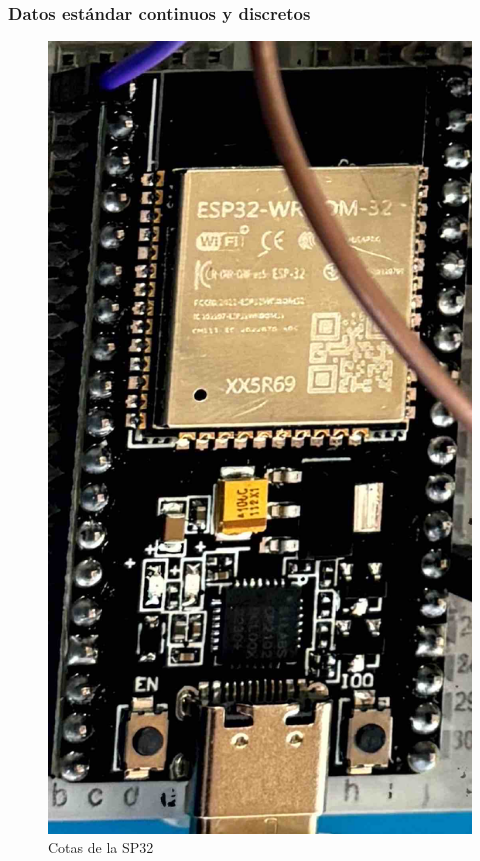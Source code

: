     \subsubsection{Datos estándar continuos y discretos}
    \begin{figure}[H]
        \centering
        \includegraphics[trim = {1mm 1mm 1mm 1mm},clip,scale=0.3]{8/Img/SP32.pdf}
        \caption{Cotas de la SP32}
        \label{Cotas SP32}
    \end{figure}
    
